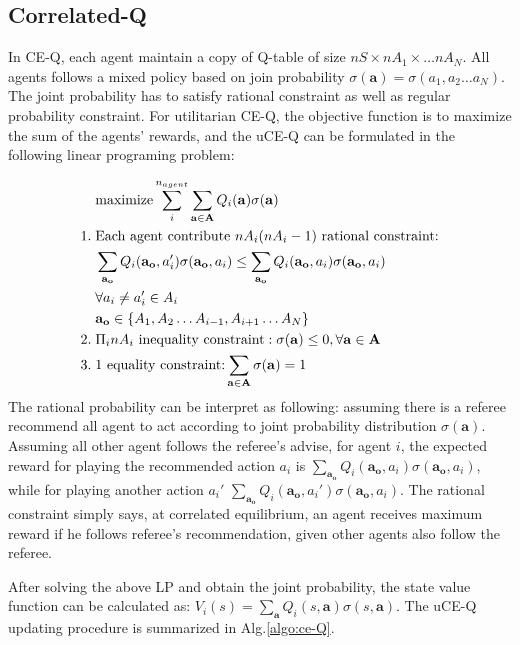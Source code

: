 \documentclass[conference]{IEEEtran}
\begin{document}
\subsection{Correlated-Q}
In CE-Q, each agent maintain a copy of Q-table of size $nS\times nA_1 \times\dots nA_N$. All agents follows a mixed policy based on join probability $\sigma(\mathbf{a}) = \sigma(a_1, a_2 \dots a_N)$. The joint probability has to satisfy rational constraint as well as regular probability constraint. For utilitarian CE-Q, the objective function is to maximize the sum of the agents’ rewards, and the uCE-Q can be formulated in the following linear programing problem:

\begin{align}
&\text{maximize} \sum_i^{n_{agent}} \sum_{\mathbf{a}\in\mathbf{A}} Q_i(\mathbf{a}) \sigma(\mathbf{a}) \notag \\
1.\; & \text{Each agent contribute $nA_i(nA_i-1)$ rational constraint:} \notag\\
& \sum_{\mathbf{a_o}} Q_i(\mathbf{a_o}, a_i')\sigma(\mathbf{a_o}, a_i) \le \sum_{\mathbf{a_o}}  Q_i(\mathbf{a_o}, a_i)  \sigma(\mathbf{a_o}, a_i) \notag \\
& \forall a_i\neq a_i' \in A_i  \notag \\
& \mathbf{a_o} \in \{ A_1, A_2 \dots A_{i-1}, A_{i+1} \dots A_{N} \} \notag \\
2.\; & \text{$\Pi_i  nA_i$ inequality constraint}: \sigma(\mathbf{a})\le 0,  \forall \mathbf{a}\in\mathbf{A}\notag \\
3.\; &\text{1 equality constraint:} \sum_{\mathbf{a}\in\mathbf{A}} \sigma(\mathbf{a}) = 1
\end{align}
The rational probability can be interpret as following: assuming there is a referee recommend all agent to act according to joint probability distribution $\sigma(\mathbf{a})$. Assuming all other agent follows the referee's advise, for agent $i$, the expected reward for playing the recommended action $a_i$ is $\sum_{\mathbf{a_o}}  Q_i(\mathbf{a_o}, a_i)  \sigma(\mathbf{a_o}, a_i)$, while for playing another action $a_i'$ $\sum_{\mathbf{a_o}}  Q_i(\mathbf{a_o}, a_i')  \sigma(\mathbf{a_o}, a_i)$. The rational constraint simply says, at correlated equilibrium, an agent receives maximum reward if he follows referee's recommendation, given other agents also follow the referee.

After solving the above LP and obtain the joint probability, the state value function can be calculated as: $V_i(s) = \sum_{\mathbf{a}} Q_i(s, \mathbf{a}) \sigma(s, \mathbf{a})$. The uCE-Q updating procedure is summarized in Alg.\ref{algo:ce-Q}.
\end{document}
